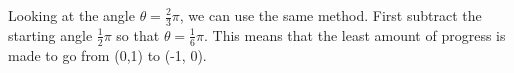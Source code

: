 \documentclass[preview]{standalone}
\begin{document}
\begin{center}
Looking at the angle $\theta = \frac{2}{3} \pi$, we can use the same method. First subtract the starting angle $\frac{1}{2} \pi$ so that $\theta = \frac{1}{6} \pi$. This means that the least amount of progress is made to go from (0,1) to (-1, 0).
\end{center}
\end{document}
